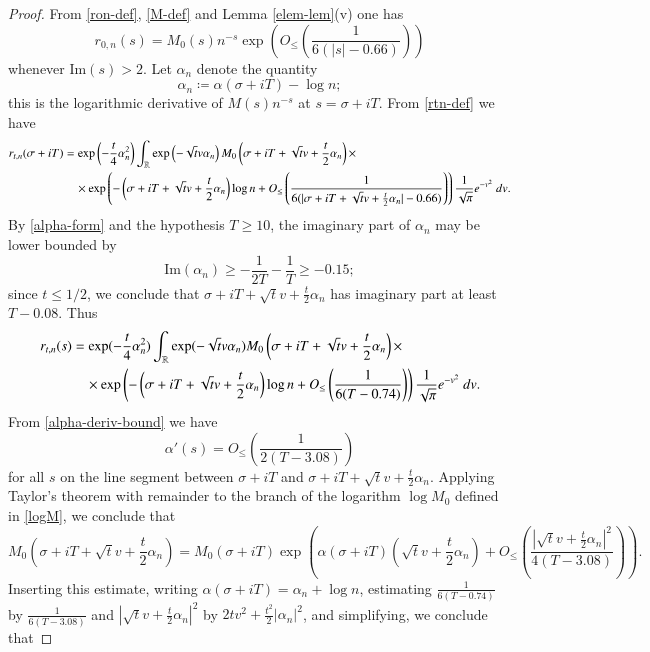 \begin{proof}  From \eqref{ron-def}, \eqref{M-def} and Lemma \ref{elem-lem}(v) one has
$$ 
r_{0,n}(s) = M_0(s) n^{-s} \exp\left( O_{\leq}\left( \frac{1}{6(|s|-0.66)} \right) \right)
$$
whenever $\mathrm{Im}(s) > 2$.  Let $\alpha_n$ denote the quantity
\begin{equation}\label{alphan-def}
\alpha_n \coloneqq \alpha(\sigma+iT) - \log n;
\end{equation}
this is the logarithmic derivative of $M(s) n^{-s}$ at $s=\sigma+iT$.  From \eqref{rtn-def} we have
\begin{align*}
 r_{t,n}(\sigma+iT) &= \exp\left( - \frac{t}{4} \alpha_n^2\right) \int_{\mathbb{R}} \exp\left( - \sqrt{t} v \alpha_n\right) M_0\left( \sigma + iT + \sqrt{t} v + \frac{t}{2} \alpha_n\right) \times \\
&\quad \times \exp\left( -\left(\sigma+iT+\sqrt{t} v + \frac{t}{2} \alpha_n \right) \log n + O_{\leq}\left( \frac{1}{6(|\sigma+iT+\sqrt{t} v + \frac{t}{2} \alpha_n|-0.66)} \right) \right)
\frac{1}{\sqrt{\pi}} e^{-v^2}\ dv.
\end{align*}
By \eqref{alpha-form} and the hypothesis $T \geq 10$, the imaginary part of $\alpha_n$ may be lower bounded by
$$ \mathrm{Im}(\alpha_n) \geq -\frac{1}{2T} - \frac{1}{T} \geq -0.15;$$
since $t \leq 1/2$, we conclude that $\sigma+iT+\sqrt{t} v + \frac{t}{2} \alpha_n$ has imaginary part at least $T - 0.08$.  Thus
\begin{align*}
 r_{t,n}(s) &= \exp( - \frac{t}{4} \alpha_n^2) \int_{\mathbb{R}} \exp( - \sqrt{t} v \alpha_n) M_0\left( \sigma + iT + \sqrt{t} v + \frac{t}{2} \alpha_n\right) \times
\\
&\quad \times \exp\left( -\left(\sigma+iT+\sqrt{t} v + \frac{t}{2} \alpha_n \right) \log n + O_{\leq}\left( \frac{1}{6(T - 0.74)} \right) \right)
\frac{1}{\sqrt{\pi}} e^{-v^2}\ dv.
\end{align*}
From \eqref{alpha-deriv-bound} we have
$$ \alpha'(s) = O_{\leq}\left( \frac{1}{2(T-3.08)} \right)$$
for all $s$ on the line segment between $\sigma+iT$ and $\sigma + iT + \sqrt{t} v + \frac{t}{2} \alpha_n$.  Applying Taylor's theorem with remainder to the branch of the logarithm $\log M_0$ defined in \eqref{logM}, we conclude that
$$ M_0( \sigma + iT + \sqrt{t} v + \frac{t}{2} \alpha_n) = M_0(\sigma+iT) \exp\left( \alpha(\sigma+iT) (\sqrt{t} v + \frac{t}{2} \alpha_n) + O_{\leq}\left( \frac{|\sqrt{t} v + \frac{t}{2} \alpha_n|^2}{4(T-3.08)}  \right)\right).$$
Inserting this estimate, writing $\alpha(\sigma+iT) = \alpha_n + \log n$, estimating $\frac{1}{6(T-0.74)}$ by $\frac{1}{6(T-3.08)}$ and $|\sqrt{t} v + \frac{t}{2} \alpha_n|^2$ by $2tv^2 + \frac{t^2}{2} |\alpha_n|^2$, and simplifying, we conclude that

\end{proof}
